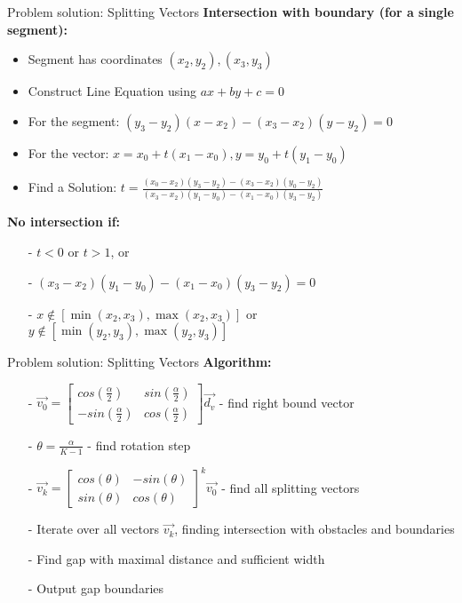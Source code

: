     \begin{frame}{Problem solution: Splitting Vectors}
    \textbf{\large Intersection with boundary (for a single segment):}
    \begin{itemize}
      \item Segment has coordinates $(x_2, y_2), (x_3, y_3)$
      \item Construct Line Equation using $ax + by + c = 0$
      \item For the segment: $(y_3 - y_2)(x - x_2) - (x_3 - x_2)(y - y_2) = 0$
      \item For the vector: $x = x_0 + t(x_1 - x_0), y = y_0 + t(y_1 - y_0)$
    
      \vspace{0.05cm}
      \item Find a Solution: $t = \frac{(x_0 - x_2)(y_3 - y_2) - (x_3 - x_2)(y_0 - y_2)}{(x_3 - x_2)(y_1 - y_0) - (x_1 - x_0)(y_3 - y_2)}$
    \end{itemize}
    \vspace{0.25cm}
    \textbf{\large No intersection if:}
    \begin{itemize}
        \item[-] $t < 0$ or $t > 1$, or
        \item[-] $(x_3 - x_2)(y_1 - y_0) - (x_1 - x_0)(y_3 - y_2) = 0$
        \item[-] $x \notin [\min(x_2, x_3), \max(x_2, x_3)]$ or $y \notin [\min(y_2, y_3), \max(y_2, y_3)]$
    \end{itemize}
    
    \end{frame}
    
    \begin{frame}{Problem solution: Splitting Vectors}
    \textbf{\large Algorithm:}
    \begin{itemize}
      \item[-] $\vec{v_0} = \begin{bmatrix}
                                cos(\frac{\alpha}{2}) & sin(\frac{\alpha}{2}) \\
                                -sin(\frac{\alpha}{2}) & cos(\frac{\alpha}{2})
                            \end{bmatrix} \vec{d_v}$
            - find right bound vector
      \item[-] $\theta = \frac{\alpha}{K - 1}$ - find rotation step
      \item[-] $\vec{v_k} = \begin{bmatrix}
                                cos(\theta) & -sin(\theta) \\
                                sin(\theta) & cos(\theta)
                            \end{bmatrix}^k \vec{v_0}$ - find all splitting vectors
      \item[-] Iterate over all vectors $\vec{v_k}$, finding intersection with obstacles and boundaries
      \item[-] Find gap with maximal distance and sufficient width 
      \item[-] Output gap boundaries
    \end{itemize}
    \end{frame}
    
